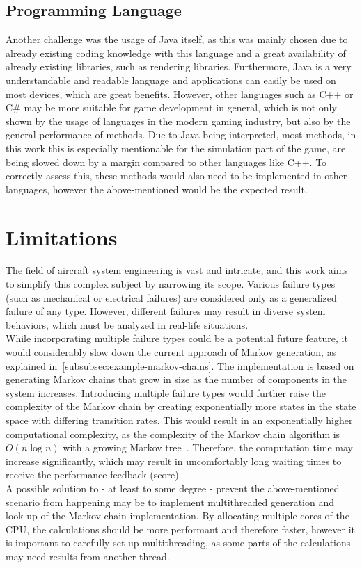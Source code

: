 \subsection{Programming Language}\label{subsec:programming-language}
Another challenge was the usage of Java itself, as this was mainly chosen due to already existing coding knowledge with this
language and a great availability of already existing libraries, such as rendering libraries.
Furthermore, Java is a very understandable and readable language and applications can easily be used on most devices, which are great benefits.
However, other languages such as C++ or C\# may be more suitable for game development in general, which is not only shown by
the usage of languages in the modern gaming industry, but
also by the general performance of methods.
Due to Java being interpreted, most methods, in this work this is especially mentionable for the simulation part of the game, are being slowed down
by a margin compared to other languages like C++.
To correctly assess this, these methods would also need to be implemented in other languages, however the above-mentioned would
be the expected result.

\section{Limitations}\label{sec:limitations}
The field of aircraft system engineering is vast and intricate, and this work aims to simplify this complex subject by narrowing its scope.
Various failure types (such as mechanical or electrical failures) are considered only as a generalized failure of any type.
However, different failures may result in diverse system behaviors, which must be analyzed in real-life situations.
\\
While incorporating multiple failure types could be a potential future feature, it would considerably slow down the current
approach of Markov generation, as explained in~\ref{subsubsec:example-markov-chains}.
The implementation is based on generating Markov chains that grow in size as the number of components in the system increases.
Introducing multiple failure types would further raise the complexity of the Markov chain by creating exponentially more states in the state space
with differing transition rates.
This would result in an exponentially higher computational complexity, as the complexity of the Markov chain algorithm is
$O(n \log{n})$ with a growing Markov tree~\cite{10.2307/2337551}.
Therefore, the computation time may increase significantly, which may result in uncomfortably long waiting times to receive the
performance feedback (score).
\\
A possible solution to - at least to some degree - prevent the above-mentioned scenario from happening may be to implement multithreaded
generation and look-up of the Markov chain implementation.
By allocating multiple cores of the \gls{CPU}, the calculations should be more performant and therefore faster, however it is important
to carefully set up multithreading, as some parts of the calculations may need results from another thread.
